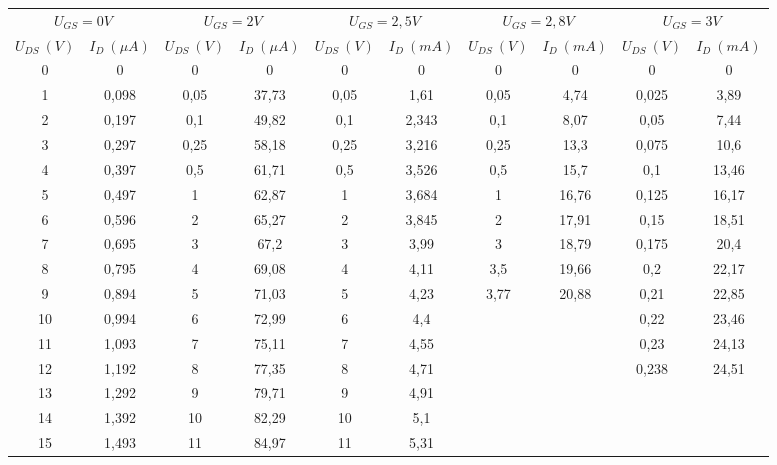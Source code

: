 \documentclass[a4paper, czech]{article}
\begin{document}
\begin{table}[H]
    \centering 
    \begin{tabular}{cccccccccc}
    \toprule
        \multicolumn{2}{c}{$U_{GS} = 0V$} & \multicolumn{2}{c}{$U_{GS} = 2V$} & \multicolumn{2}{c}{$U_{GS} = 2,5V$} & \multicolumn{2}{c}{$U_{GS} = 2,8V$} & \multicolumn{2}{c}{$U_{GS} = 3V$} \\ 
        $U_{DS}\ (V)$ & $I_D\ (\mu A)$ & $U_{DS}\ (V)$ & $I_D\ (\mu A)$ & $U_{DS}\ (V)$ & $I_D\ (mA)$ & $U_{DS}\ (V)$ & $I_D\ (mA)$ & $U_{DS}\ (V)$ & $I_D\ (mA)$ \\
        \midrule
        0  & 0     & 0    & 0      & 0     & 0     & 0    & 0     & 0     & 0     \\
        1  & 0,098 & 0,05 & 37,73  & 0,05  & 1,61  & 0,05 & 4,74  & 0,025 & 3,89  \\
        2  & 0,197 & 0,1  & 49,82  & 0,1   & 2,343 & 0,1  & 8,07  & 0,05  & 7,44  \\
        3  & 0,297 & 0,25 & 58,18  & 0,25  & 3,216 & 0,25 & 13,3  & 0,075 & 10,6  \\
        4  & 0,397 & 0,5  & 61,71  & 0,5   & 3,526 & 0,5  & 15,7  & 0,1   & 13,46 \\
        5  & 0,497 & 1    & 62,87  & 1     & 3,684 & 1    & 16,76 & 0,125 & 16,17 \\
        6  & 0,596 & 2    & 65,27  & 2     & 3,845 & 2    & 17,91 & 0,15  & 18,51 \\
        7  & 0,695 & 3    & 67,2   & 3     & 3,99  & 3    & 18,79 & 0,175 & 20,4  \\
        8  & 0,795 & 4    & 69,08  & 4     & 4,11  & 3,5  & 19,66 & 0,2   & 22,17 \\
        9  & 0,894 & 5    & 71,03  & 5     & 4,23  & 3,77 & 20,88 & 0,21  & 22,85 \\
        10 & 0,994 & 6    & 72,99  & 6     & 4,4   &      &       & 0,22  & 23,46 \\
        11 & 1,093 & 7    & 75,11  & 7     & 4,55  &      &       & 0,23  & 24,13 \\
        12 & 1,192 & 8    & 77,35  & 8     & 4,71  &      &       & 0,238 & 24,51 \\
        13 & 1,292 & 9    & 79,71  & 9     & 4,91  &      &       &       &       \\
        14 & 1,392 & 10   & 82,29  & 10    & 5,1   &      &       &       &       \\
        15 & 1,493 & 11   & 84,97  & 11    & 5,31  &      &       &       &       \\

\end{tabular}
\end{table}
\end{document}

